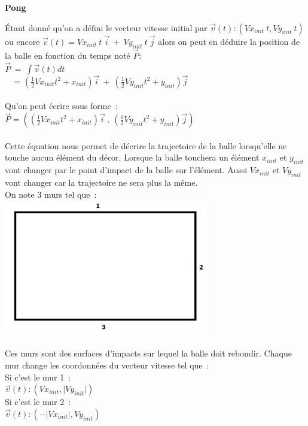\documentclass{report}
\begin{document}
\begin{center}
\textbf{Pong}
\end{center}
\graphicspath{ {./LaTeX1/} }

Étant donné qu’on a défini le vecteur vitesse initial par $\vec{v}(t):(Vx_{init}~t,Vy_{init}~t)$ ou encore $\vec{v}(t)=Vx_{init}~t~\vec{i}~+~Vy_{init}~t~\vec{j}$ alors on peut en déduire la position de la balle en fonction du temps noté $\vec{P}$:\\
$\vec{P}~=~\int\vec{v}(t)dt$\\
$~~~~~$= $(\frac{1}{2}Vx_{init}t^{2}+x_{init})\vec{i}~+~(\frac{1}{2}Vy_{init}t^{2}+y_{init})\vec{j}$\\
\\
Qu’on peut écrire sous forme :\\
$\vec{P}=((\frac{1}{2}Vx_{init}t^{2}+x_{init})\vec{i}~,~(\frac{1}{2}Vy_{init}t^{2}+y_{init})\vec{j})$\\
\\
Cette équation nous permet de décrire la trajectoire de la balle lorsqu’elle ne touche aucun élément du décor. Lorsque la balle touchera un élément $x_{init}$ et $y_{init}$ vont changer par le point d’impact de la balle sur l’élément. Aussi $Vx_{init}$ et $Vy_{init}$ vont changer car la trajectoire ne sera plus la même.\\
On note 3 murs tel que :\\
\includegraphics{murs}\\
\\
Ces murs sont des surfaces d’impacts sur lequel la balle doit rebondir. Chaque mur change les coordonnées du vecteur vitesse tel que :\\
Si c’est le mur 1 :\\
$\vec{v}(t):(Vx_{init},\lvert Vy_{init} \rvert)$\\
Si c’est le mur 2 :\\
$\vec{v}(t):(-\lvert Vx_{init} \rvert,Vy_{init})$\\
\end{document}
